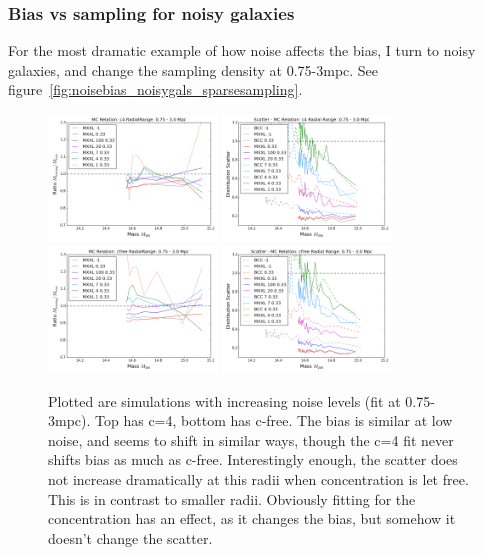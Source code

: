 \documentclass[11pt]{article}
\begin{document}

\subsubsection{Bias vs sampling for noisy galaxies}

For the most dramatic example of how noise affects the bias, I turn to noisy galaxies, and change the sampling density at 0.75-3mpc. See figure~\ref{fig:noisebias_noisygals_sparsesampling}.

\begin{figure}
\includegraphics[width=0.4\textwidth]{figures/density_noise2_c4-r10}
\includegraphics[width=0.4\textwidth]{figures/density_noise2_c4-r10_scatter}\\
\includegraphics[width=0.4\textwidth]{figures/density_noise2_cfree-r10}
\includegraphics[width=0.4\textwidth]{figures/density_noise2_cfree-r10_scatter}
\caption{Plotted are simulations with increasing noise levels (fit at 0.75-3mpc). Top has c=4, bottom has c-free. The bias is similar at low noise, and seems to shift in similar ways, though the c=4 fit never shifts bias as much as c-free. Interestingly enough, the scatter does not increase dramatically at this radii when concentration is let free. This is in contrast to smaller radii. Obviously fitting for the concentration has an effect, as it changes the bias, but somehow it doesn't change the scatter.}
\end{figure}
\end{document}
